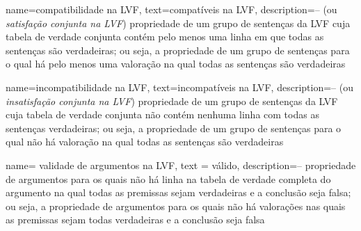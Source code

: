 {
  name=compatibilidade na LVF,
  text=compatíveis na LVF,
description={-- (ou \textit{satisfação conjunta na LVF}) propriedade de um grupo de sentenças da LVF cuja tabela de verdade conjunta contém pelo menos uma linha em que todas as sentenças são verdadeiras; ou seja, a propriedade de um grupo de sentenças para o qual há pelo menos uma valoração na qual todas as sentenças são verdadeiras}
}

{
  name=incompatibilidade na LVF,
  text=incompatíveis na LVF,
description={-- (ou \textit{insatisfação conjunta na LVF}) propriedade de um grupo de sentenças da LVF cuja tabela de verdade conjunta não contém nenhuma linha com todas as sentenças verdadeiras; ou seja, a propriedade de um grupo de sentenças para o qual não há valoração na qual todas as sentenças são verdadeiras}
}

{
name= validade de argumentos na LVF,
text = válido,
description={-- propriedade de argumentos para os quais não há linha na tabela de verdade completa do argumento na qual todas as premissas sejam verdadeiras e a conclusão seja falsa; ou seja, a propriedade de argumentos para os quais não há valorações nas quais as premissas sejam todas verdadeiras e a conclusão seja falsa}
}







